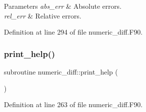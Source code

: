 \begin{DoxyParams}{Parameters}
{\em abs\+\_\+err} & Absolute errors.\\
\hline
{\em rel\+\_\+err} & Relative errors. \\
\hline
\end{DoxyParams}


Definition at line 294 of file numeric\+\_\+diff.\+F90.

\mbox{\label{numeric__diff_8_f90_a4e8958efa57e8d49a84f42e0795c84c5}} 
\subsubsection{\texorpdfstring{print\+\_\+help()}{print\_help()}}
{\footnotesize\ttfamily subroutine numeric\+\_\+diff\+::print\+\_\+help (\begin{DoxyParamCaption}{ }\end{DoxyParamCaption})}



Definition at line 263 of file numeric\+\_\+diff.\+F90.


